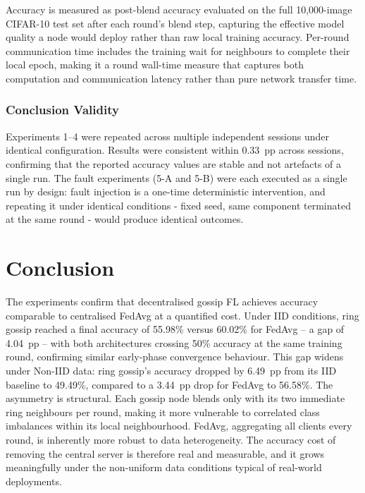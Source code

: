 \documentclass[12pt]{report}
\begin{document}
Accuracy is measured as post-blend accuracy evaluated on the full 10,000-image
CIFAR-10 test set after each round's blend step, capturing the effective model
quality a node would deploy rather than raw local training accuracy.
Per-round communication time includes the training wait for neighbours to
complete their local epoch, making it a round wall-time measure that captures
both computation and communication latency rather than pure network transfer time.

\subsection*{Conclusion Validity}

Experiments 1--4 were repeated across multiple independent sessions under
identical configuration. Results were consistent within 0.33~pp across sessions,
confirming that the reported accuracy values are stable and not artefacts of a
single run. The fault experiments (5-A and 5-B) were each executed as a single
run by design: fault injection is a one-time deterministic intervention, and
repeating it under identical conditions - fixed seed, same component terminated
at the same round - would produce identical outcomes.

\chapter{Conclusion}

The experiments confirm that decentralised gossip FL achieves accuracy
comparable to centralised FedAvg at a quantified cost. Under IID conditions,
ring gossip reached a final accuracy of 55.98\% versus 60.02\% for FedAvg --
a gap of 4.04~pp -- with both architectures crossing 50\% accuracy at the same
training round, confirming similar early-phase convergence behaviour. This gap
widens under Non-IID data: ring gossip's accuracy dropped by 6.49~pp from its
IID baseline to 49.49\%, compared to a 3.44~pp drop for FedAvg to 56.58\%.
The asymmetry is structural. Each gossip node blends only with its two immediate
ring neighbours per round, making it more vulnerable to correlated class
imbalances within its local neighbourhood. FedAvg, aggregating all clients every
round, is inherently more robust to data heterogeneity. The accuracy cost of
removing the central server is therefore real and measurable, and it grows
meaningfully under the non-uniform data conditions typical of real-world
deployments.
\end{document}
